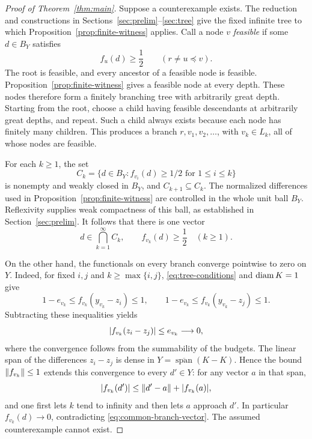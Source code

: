 \begin{proof}[Proof of Theorem~\ref{thm:main}]
Suppose a counterexample exists. The reduction and constructions in
Sections~\ref{sec:prelim}--\ref{sec:tree} give the fixed infinite tree to
which Proposition~\ref{prop:finite-witness} applies.
Call a node $v$ \emph{feasible} if some $d\in B_Y$ satisfies
\[
  f_u(d)\geq\frac12\qquad(r\ne u\preceq v).
\]
The root is feasible, and every ancestor of a feasible node is feasible.
Proposition~\ref{prop:finite-witness} gives a feasible node at every depth.
These nodes therefore form a finitely branching tree with arbitrarily
great depth. Starting from the root, choose a child having feasible
descendants at arbitrarily great depths, and repeat. Such a child always
exists because each node has finitely many children. This produces a
branch $r,v_1,v_2,\ldots$, with $v_k\in L_k$, all of whose nodes are
feasible.

For each $k\geq 1$, the set
\[
  C_k=\{d\in B_Y:f_{v_i}(d)\geq 1/2\text{ for }1\leq i\leq k\}
\]
is nonempty and weakly closed in $B_Y$, and $C_{k+1}\subseteq C_k$.
The normalized differences used in Proposition~\ref{prop:finite-witness}
are controlled in the whole unit ball $B_Y$. Reflexivity supplies weak
compactness of this ball, as established in Section~\ref{sec:prelim}.
It follows that there is one vector
\begin{equation}
  d\in\bigcap_{k=1}^{\infty}C_k,
  \qquad
  f_{v_k}(d)\geq\frac12\quad(k\geq 1).
  \label{eq:common-branch-vector}
\end{equation}

On the other hand, the functionals on every branch converge pointwise
to zero on $Y$. Indeed, for fixed $i,j$ and $k\geq\max\{i,j\}$,
\eqref{eq:tree-conditions} and $\operatorname{diam} K=1$ give
\[
  1-e_{v_k}\leq f_{v_k}(y_{v_k}-z_i)\leq 1,
  \qquad
  1-e_{v_k}\leq f_{v_k}(y_{v_k}-z_j)\leq 1.
\]
Subtracting these inequalities yields
\[
  \lvert f_{v_k}(z_i-z_j)\rvert\leq e_{v_k}\longrightarrow 0,
\]
where the convergence follows from the summability of the budgets.
The linear span of the differences $z_i-z_j$ is dense in
$Y=\overline{\operatorname{span}}(K-K)$. Hence the bound
$\lVert f_{v_k}\rVert\leq 1$ extends this convergence to every $d'\in Y$:
for any vector $a$ in that span,
\[
  \lvert f_{v_k}(d')\rvert\leq\lVert d'-a\rVert+\lvert f_{v_k}(a)\rvert,
\]
and one first lets $k$ tend to infinity and then lets $a$ approach $d'$.
In particular $f_{v_k}(d)\to 0$, contradicting
\eqref{eq:common-branch-vector}. The assumed counterexample cannot exist.
\end{proof}
